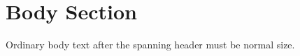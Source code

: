 \documentclass{article}
\begin{document}
\section{Body Section}
Ordinary body text after the spanning header must be normal size.
\end{document}
